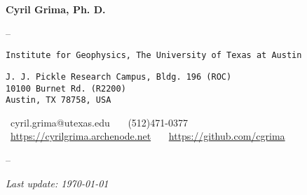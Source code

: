 \begin{center}

{\LARGE \textbf{Cyril Grima, Ph. D.}}
\vspace{.5em}

\hspace{0pt}{\large Research Associate}

--

\noindent\hspace{0pt}\texttt{Institute for Geophysics, The University of Texas at Austin}

\noindent\hspace{0pt}\texttt{J. J. Pickle Research Campus, Bldg. 196 (ROC) \\
10100 Burnet Rd. (R2200) \\
Austin, TX 78758, USA}
\vspace{.5em}

\noindent\hspace{0pt}\faInbox \ cyril.grima@utexas.edu \ \ \faPhone \ (512)471-0377 \\
\faDesktop \ \href{https://cyrilgrima.archenode.net}{https://cyrilgrima.archenode.net} \ \ \faGithub \ \href{https://github.com/cgrima}{https://github.com/cgrima}

--

\textit{Last update: \today}

\end{center}
\vspace{-1em}